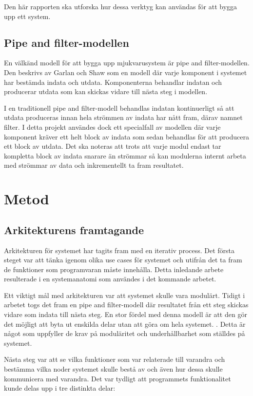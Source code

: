 Den här rapporten ska utforska hur dessa verktyg kan användas för att bygga upp ett system.

\subsection{Pipe and filter-modellen}
En välkänd modell för att bygga upp mjukvarusystem är pipe and filter-modellen. Den beskrivs av Garlan och Shaw \cite{garlan1993introduction} som en modell där varje komponent i systemet har bestämda indata och utdata. Komponenterna behandlar indatan och producerar utdata som kan skickas vidare till nästa steg i modellen.

I en traditionell pipe and filter-modell behandlas indatan kontinuerligt så att utdata produceras innan hela strömmen av indata har nått fram, därav namnet filter. I detta projekt användes dock ett specialfall av modellen där varje komponent kräver ett helt block av indata som sedan behandlas för att producera ett block av utdata. Det ska noteras att trots att varje modul endast tar kompletta block av indata snarare än strömmar så kan modulerna internt arbeta med strömmar av data och inkrementellt ta fram resultatet.


\section{Metod}
\label{sec:method-lundberg}

\subsection{Arkitekturens framtagande}
Arkitekturen för systemet har tagits fram med en iterativ process. Det första steget var att tänka igenom olika use cases för systemet och utifrån det ta fram de funktioner som programvaran måste innehålla. Detta inledande arbete resulterade i en systemanatomi som användes i det kommande arbetet.

Ett viktigt mål med arkitekturen var att systemet skulle vara modulärt. Tidigt i arbetet togs det fram en pipe and filter-modell där resultatet från ett steg skickas vidare som indata till nästa steg. En stor fördel med denna modell är att den gör det möjligt att byta ut enskilda delar utan att göra om hela systemet. \cite{garlan1993introduction}. Detta är något som uppfyller de krav på moduläritet och underhållbarhet som ställdes på systemet.

Nästa steg var att se vilka funktioner som var relaterade till varandra och bestämma vilka noder systemet skulle bestå av och även hur dessa skulle kommunicera med varandra. Det var tydligt att programmets funktionalitet kunde delas upp i tre distinkta delar:

